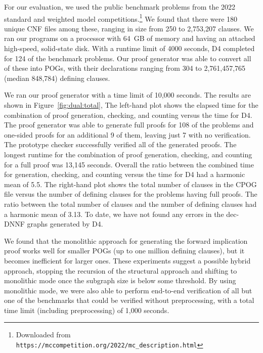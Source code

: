 \documentclass[twoside,11pt]{article}
\newcommand{\url}[1]{\texttt{#1}}
\newcommand{\progname}[1]{\textsc{#1}}
\newcommand{\dfour}{\progname{D4}}
\begin{document}
For our
evaluation, we used the public benchmark problems from the 2022
standard and weighted model competitions.\footnote{Downloaded from \url{https://mccompetition.org/2022/mc\_description.html}}  We found that there were
180 unique CNF files among these, ranging in size from 250 to
2,753,207 clauses.
We ran our programs on a processor with 64~GB of
memory and having an attached high-speed, solid-state
disk.
With a runtime limit of 4000 seconds, \dfour{} completed for 124 of the
benchmark problems.  Our proof generator was able to convert all of
these into POGs, with their declarations ranging from 304 to
2,761,457,765 (median 848,784) defining clauses.

We ran our proof generator with a time limit of 10,000 seconds.  The
results are shown in Figure~\ref{fig:dual:total}, The left-hand plot
shows the elapsed time for the combination of proof generation,
checking, and counting versus the time for
\dfour{}.
The proof generator was able to generate full proofs for 108 of the problems and
one-sided proofs for an additional 9 of them, leaving just 7 with no
verification.  The prototype checker successfully verified all of the generated
proofs.  The longest runtime for the combination of proof generation, checking, and counting
for a full proof was 13,145 seconds.
Overall the ratio
between the combined time for generation, checking, and counting versus the time
for \dfour{} had a harmonic mean of 5.5.
The right-hand plot shows the total number of clauses in the CPOG file versus the number of defining clauses for the problems having full proofs.
The ratio between the total number of clauses and the number of defining clauses had a harmonic mean of 3.13.
To date, we have not found
any errors in the dec-DNNF graphs generated by \dfour{}.

We found that the monolithic approach for generating the forward
implication proof works well for smaller POGs (up to one million
defining clauses), but it becomes inefficient for larger ones.  These
experiments suggest a possible hybrid approach, stopping the recursion
of the structural approach and shifting to monolithic mode once the
subgraph size is below some threshold.  By using monolithic mode, we
were also able to perform end-to-end verification of all but one of the
benchmarks that could be verified without preprocessing, with a total
time limit (including preprocessing) of 1,000 seconds.
\end{document}
